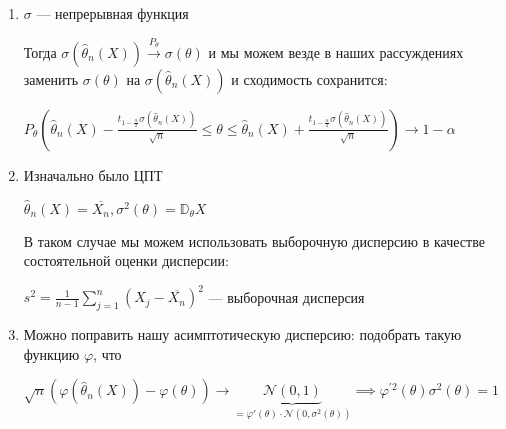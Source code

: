 \begin{enumerate}
    \begin{enumerate}
        \item $\sigma$ --- непрерывная функция
        
        Тогда $\sigma(\hat{\theta}_n(X)) \xrightarrow{P_\theta} \sigma(\theta)$ и мы можем
        везде в наших рассуждениях заменить $\sigma(\theta)$ на $\sigma(\hat{\theta}_n(X))$ и
        сходимость сохранится:

        $P_\theta(\hat{\theta}_n(X) - \frac{t_{1 - \frac{\alpha}{2}}\sigma(\hat{\theta}_n(X))}{\sqrt{n}}
    \leq \theta \leq \hat{\theta}_n(X) + \frac{t_{1 - \frac{\alpha}{2}}\sigma(\hat{\theta}_n(X))}{\sqrt{n}}) 
    \to 1 - \alpha$

        \item Изначально было ЦПТ
        
        $\hat{\theta}_n(X) = \overline{X_n}, \sigma^2(\theta) = \mathbb{D}_\theta X$

        В таком случае мы можем использовать выборочную дисперсию в качестве состоятельной
        оценки дисперсии:

        $s^2 = \frac{1}{n - 1} \sum_{j = 1}^n (X_j - \overline{X_n})^2$ --- выборочная дисперсия

        \item Можно поправить нашу асимптотическую дисперсию: подобрать такую функцию $\varphi$,
        что 
        
        $\sqrt{n}(\varphi(\hat{\theta}_n(X)) - \varphi(\theta)) \to 
        \underbrace{\mathcal{N}(0, 1)}_{=\varphi'(\theta) \cdot \mathcal{N}(0, \sigma^2(\theta))} 
        \implies \varphi^{'2}(\theta)\sigma^2(\theta) = 1$

    \end{enumerate}
\end{enumerate}
